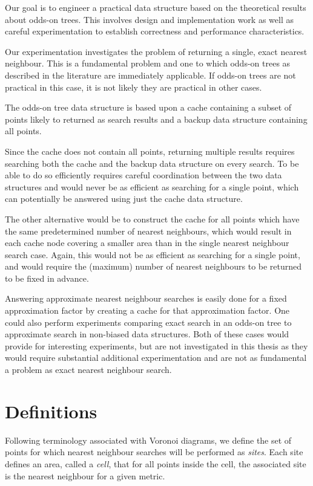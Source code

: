 \documentclass[mcs]{scsthesis}
\begin{document}
Our goal is to engineer a practical data structure based on the theoretical
results about odds-on trees. This involves design and implementation work as
well as careful experimentation to establish correctness and performance
characteristics.

Our experimentation investigates the problem of returning a single, exact
nearest neighbour. This is a fundamental problem and one to which odds-on trees
as described in the literature are immediately applicable. If odds-on trees are
not practical in this case, it is not likely they are practical in other cases.

The odds-on tree data structure is based upon a cache containing a subset of
points likely to returned as search results and a backup data structure 
containing all points.

Since the cache does not contain all points, returning multiple results requires
searching both the cache and the backup data structure on every search. To be
able to do so efficiently requires careful coordination between the two data
structures and would never be as efficient as searching for a single point,
which can potentially be answered using just the cache data structure.

The other alternative would be to construct the cache for all points which have
the same predetermined number of nearest neighbours, which would result in each
cache node covering a smaller area than in the single nearest neighbour search 
case. Again, this would not be as efficient as searching for a single point, and
would require the (maximum) number of nearest neighbours to be returned to be
fixed in advance.

Answering approximate nearest neighbour searches is easily done for a fixed
approximation factor by creating a cache for that approximation factor. One
could also perform experiments comparing exact search in an odds-on tree to 
approximate search in non-biased data structures. Both of these cases would
provide for interesting experiments, but are not investigated in this thesis as
they would require substantial additional experimentation and are not as
fundamental a problem as exact nearest neighbour search.

\section{Definitions}

Following terminology associated with Voronoi diagrams, we define the set of
points for which nearest neighbour searches will be performed as \emph{sites}.
Each site defines an area, called a \emph{cell}, that for all points inside the
cell, the associated site is the nearest neighbour for a given metric.
\end{document}
